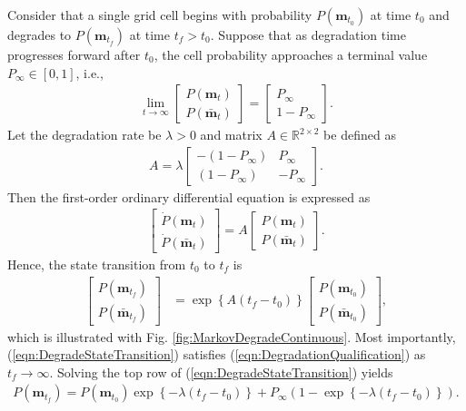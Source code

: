 \documentclass[smallextended]{svjour3}       %
\newcommand{\braces}[1]{\ensuremath{\left\{ #1 \right\}}}
\newcommand{\refeqn}[1]{(\ref{eqn:#1})}
\renewcommand{\Re}{\ensuremath{\mathbb{R}}}
\begin{document}
Consider that a single grid cell begins with probability $P(\mathbf{m}_{t_0})$ at time $t_0$ and degrades to $P(\mathbf{m}_{t_f})$ at time $t_f>t_0$. Suppose that as degradation time progresses forward after $t_0$, the cell probability approaches a terminal value $P_\infty\in[0,1]$, i.e.,
\begin{align}
\label{eqn:DegradationQualification}
\lim_{t\rightarrow\infty}\begin{bmatrix}
P(\mathbf{m}_{t})
\\
P(\bar{\mathbf{m}}_{t})
\end{bmatrix}
=
\begin{bmatrix}
P_\infty
\\
1-P_\infty
\end{bmatrix}.
\end{align}
Let the degradation rate be $\lambda>0$ and matrix $A\in\Re^{2\times2}$ be defined as
\begin{align}
A=\lambda
\begin{bmatrix}
-(1-P_\infty) & P_\infty
\\
(1-P_\infty) & -P_\infty
\end{bmatrix}.
\end{align}
Then the first-order ordinary differential equation is expressed as
\begin{align}
\begin{bmatrix}
\dot{P}(\mathbf{m}_{t})
\\
\dot{P}(\bar{\mathbf{m}}_{t})
\end{bmatrix}
=
A
\begin{bmatrix}
P(\mathbf{m}_{t})
\\
P(\bar{\mathbf{m}}_{t})
\end{bmatrix}.
\end{align}
Hence, the state transition from $t_0$ to $t_f$ is
\begin{align}
\label{eqn:DegradeStateTransition}
\begin{bmatrix}
P(\mathbf{m}_{t_f})
\\
P(\bar{\mathbf{m}}_{t_f})
\end{bmatrix}
&=
\exp\braces{A(t_f-t_0)}
\begin{bmatrix}
P(\mathbf{m}_{t_0})
\\
P(\bar{\mathbf{m}}_{t_0})
\end{bmatrix},
\end{align}
which is illustrated with Fig. \ref{fig:MarkovDegradeContinuous}. Most importantly, \refeqn{DegradeStateTransition} satisfies \refeqn{DegradationQualification} as $t_f\rightarrow\infty$. Solving the top row of \refeqn{DegradeStateTransition} yields
\begin{align}
\label{eqn:CellDegradationScalar}
P(\mathbf{m}_{t_f})=P(\mathbf{m}_{t_0})\exp\braces{-\lambda (t_f-t_0)}+P_\infty(1-\exp\braces{-\lambda (t_f-t_0)}).
\end{align}
\end{document}
